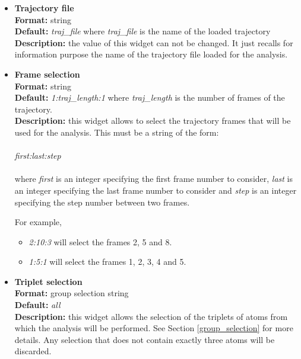 \documentclass[a4paper,11pt]{report}
\begin{document}
\hypertarget{ac_trajectory_file}{}
\begin{itemize}
\item \textbf{Trajectory file}\\
\textbf{Format:} string\\
\textbf{Default:} \textit{traj\_file} where \textit{traj\_file} is the name of the loaded trajectory\\
\textbf{Description:} the value of this widget can not be changed. It just recalls for information purpose the name
of the trajectory file loaded for the analysis.

\hypertarget{ac_frame_selection}{}
\item \textbf{Frame selection}\\
\textbf{Format:} string\\
\textbf{Default:} \textit{1:traj\_length:1} where \textit{traj\_length} is the number of frames of the trajectory.\\
\textbf{Description:} this widget allows to select the trajectory frames that will be used for the analysis. This must
be a string of the form:
\\\\
\textit{first:last:step}
\\\\
where \textit{first} is an integer specifying the first frame number to consider, \textit{last} is an integer specifying the last 
frame number to consider and \textit{step} is an integer specifying the step number between two frames.

For example,
\begin{itemize}
\item \textit{2:10:3} will select the frames 2, 5 and 8.
\item \textit{1:5:1} will select the frames 1, 2, 3, 4 and 5.
\end{itemize}

\hypertarget{ac_triplet_selection}{}
\item \textbf{Triplet selection}\\
\textbf{Format:} group selection string\\
\textbf{Default:} \textit{all}\\
\textbf{Description:} this widget allows the selection of the triplets of atoms from which the analysis will be 
performed. See Section \ref{group_selection} for more details. Any selection that does not contain exactly three atoms will 
be discarded.


\end{itemize}
\end{document}
